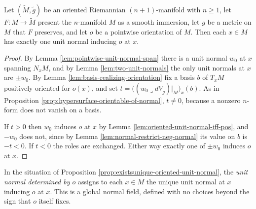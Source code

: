 \begin{proposition}
\label{prop:existsunique-oriented-unit-normal}
\leanok
{}
Let $(\tilde M, \tilde g)$ be an oriented Riemannian $(n+1)$-manifold with $n \geq 1$, let
$F : M \to \tilde M$ present the $n$-manifold $M$ as a smooth immersion, let $g$ be a metric on
$M$ that $F$ preserves, and let $o$ be a pointwise orientation of $M$. Then each $x \in M$ has
exactly one unit normal inducing $o$ at $x$.
\end{proposition}

\begin{proof}
\leanok
{}
By Lemma \ref{lem:pointwise-unit-normal-span} there is a unit normal $w_0$ at $x$ spanning
$N_x M$, and by Lemma \ref{lem:two-unit-normals} the only unit normals at $x$ are $\pm w_0$. By
Lemma \ref{lem:basis-realizing-orientation} fix a basis $b$ of $T_x M$ positively oriented for
$o(x)$, and set $t = \bigl((w_0 \lrcorner dV_{\tilde g})|_M\bigr)_x(b)$. As in Proposition
\ref{prop:hypersurface-orientable-of-normal}, $t \neq 0$, because a nonzero $n$-form does not
vanish on a basis.

If $t > 0$ then $w_0$ induces $o$ at $x$ by Lemma \ref{lem:oriented-unit-normal-iff-pos}, and
$-w_0$ does not, since by Lemma \ref{lem:normal-restrict-neg-normal} its value on $b$ is $-t < 0$.
If $t < 0$ the roles are exchanged. Either way exactly one of $\pm w_0$ induces $o$ at $x$.
\end{proof}

\begin{definition}
\label{def:unit-normal-of-orientation}
\leanok
{}
In the situation of Proposition \ref{prop:existsunique-oriented-unit-normal}, the
\emph{unit normal determined by $o$} assigns to each $x \in M$ the unique unit normal at $x$
inducing $o$ at $x$. This is a global normal field, defined with no choices beyond the sign that
$o$ itself fixes.
\end{definition}

